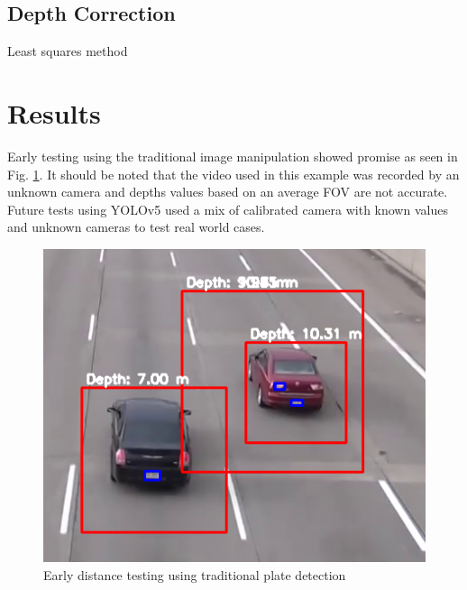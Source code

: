 \documentclass[12pt]{article}
\begin{document}

\subsection{Depth Correction}
Least squares method

\section{Results}

Early testing using the traditional image manipulation showed promise as seen in Fig. \ref{fig:tradPlateDist}. It should be noted that the video used in this example was recorded by an unknown camera and depths values based on an average FOV are not accurate. Future tests using YOLOv5 used a mix of calibrated camera with known values and unknown cameras to test real world cases.

\begin{figure}[H]
    \centering
    \includegraphics[scale=0.55]{RGB Screenshot from 2023-05-19 13-07-10.png}
    \caption{Early distance testing using traditional plate detection}
    \label{fig:tradPlateDist}
\end{figure}
\end{document}
